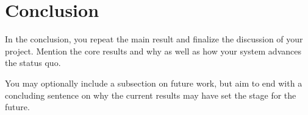 \chapter{Conclusion}

In the conclusion, you repeat the main result and finalize the discussion of
your project. Mention the core results and why as well as how your system
advances the status quo.

You may optionally include a subsection on future work, but aim to end with a concluding sentence on why the current results may have set the stage for the future.
